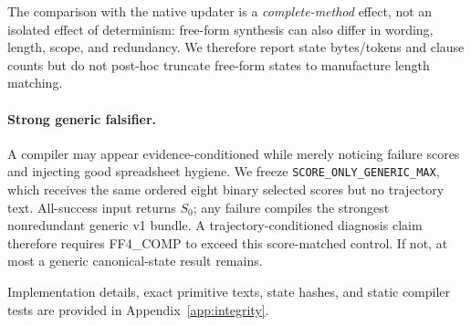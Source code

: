 The comparison with the native updater is a \emph{complete-method} effect, not an isolated effect of determinism: free-form synthesis can also differ in wording, length, scope, and redundancy. We therefore report state bytes/tokens and clause counts but do not post-hoc truncate free-form states to manufacture length matching.

\paragraph{Strong generic falsifier.}
A compiler may appear evidence-conditioned while merely noticing failure scores and injecting good spreadsheet hygiene. We freeze \texttt{SCORE\_ONLY\_GENERIC\_MAX}, which receives the same ordered eight binary selected scores but no trajectory text. All-success input returns $S_0$; any failure compiles the strongest nonredundant generic v1 bundle. A trajectory-conditioned diagnosis claim therefore requires FF4\_COMP to exceed this score-matched control. If not, at most a generic canonical-state result remains.

Implementation details, exact primitive texts, state hashes, and static compiler tests are provided in Appendix~\ref{app:integrity}.
